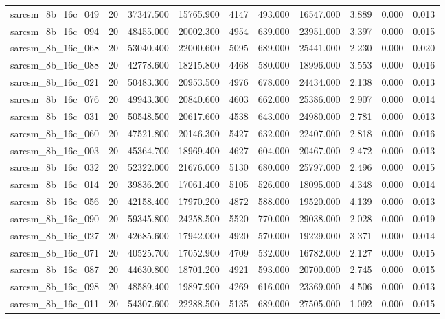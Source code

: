 \begin{tabular}{lrrrrrrrrr}
sarcsm\_8b\_16c\_049 & 20 & 37347.500 & 15765.900 & 4147 & 493.000 & 16547.000 & 3.889 & 0.000 & 0.013 \\
sarcsm\_8b\_16c\_094 & 20 & 48455.000 & 20002.300 & 4954 & 639.000 & 23951.000 & 3.397 & 0.000 & 0.015 \\
sarcsm\_8b\_16c\_068 & 20 & 53040.400 & 22000.600 & 5095 & 689.000 & 25441.000 & 2.230 & 0.000 & 0.020 \\
sarcsm\_8b\_16c\_088 & 20 & 42778.600 & 18215.800 & 4468 & 580.000 & 18996.000 & 3.553 & 0.000 & 0.016 \\
sarcsm\_8b\_16c\_021 & 20 & 50483.300 & 20953.500 & 4976 & 678.000 & 24434.000 & 2.138 & 0.000 & 0.013 \\
sarcsm\_8b\_16c\_076 & 20 & 49943.300 & 20840.600 & 4603 & 662.000 & 25386.000 & 2.907 & 0.000 & 0.014 \\
sarcsm\_8b\_16c\_031 & 20 & 50548.500 & 20617.600 & 4538 & 643.000 & 24980.000 & 2.781 & 0.000 & 0.013 \\
sarcsm\_8b\_16c\_060 & 20 & 47521.800 & 20146.300 & 5427 & 632.000 & 22407.000 & 2.818 & 0.000 & 0.016 \\
sarcsm\_8b\_16c\_003 & 20 & 45364.700 & 18969.400 & 4627 & 604.000 & 20467.000 & 2.472 & 0.000 & 0.013 \\
sarcsm\_8b\_16c\_032 & 20 & 52322.000 & 21676.000 & 5130 & 680.000 & 25797.000 & 2.496 & 0.000 & 0.015 \\
sarcsm\_8b\_16c\_014 & 20 & 39836.200 & 17061.400 & 5105 & 526.000 & 18095.000 & 4.348 & 0.000 & 0.014 \\
sarcsm\_8b\_16c\_056 & 20 & 42158.400 & 17970.200 & 4872 & 588.000 & 19520.000 & 4.139 & 0.000 & 0.013 \\
sarcsm\_8b\_16c\_090 & 20 & 59345.800 & 24258.500 & 5520 & 770.000 & 29038.000 & 2.028 & 0.000 & 0.019 \\
sarcsm\_8b\_16c\_027 & 20 & 42685.600 & 17942.000 & 4920 & 570.000 & 19229.000 & 3.371 & 0.000 & 0.014 \\
sarcsm\_8b\_16c\_071 & 20 & 40525.700 & 17052.900 & 4709 & 532.000 & 16782.000 & 2.127 & 0.000 & 0.015 \\
sarcsm\_8b\_16c\_087 & 20 & 44630.800 & 18701.200 & 4921 & 593.000 & 20700.000 & 2.745 & 0.000 & 0.015 \\
sarcsm\_8b\_16c\_098 & 20 & 48589.400 & 19897.900 & 4269 & 616.000 & 23369.000 & 4.506 & 0.000 & 0.013 \\
sarcsm\_8b\_16c\_011 & 20 & 54307.600 & 22288.500 & 5135 & 689.000 & 27505.000 & 1.092 & 0.000 & 0.015 \\

\end{tabular}
